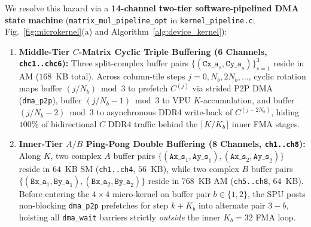 \documentclass[journal]{IEEEtran}
\begin{document}
We resolve this hazard via a \textbf{14-channel two-tier software-pipelined DMA state machine} (\texttt{matrix\_mul\_pipeline\_opt} in \texttt{kernel\_pipeline.c}; Fig.~\ref{fig:microkernel}(a) and Algorithm~\ref{alg:device_kernel}):
\begin{enumerate}\setlength{\itemsep}{0.5pt}\setlength{\parskip}{0pt}
    \item \textbf{Middle-Tier $C$-Matrix Cyclic Triple Buffering (6 Channels, \texttt{chc1..chc6}):} Three split-complex buffer pairs $\{(\texttt{Cx\_a}_s, \texttt{Cy\_a}_s)\}_{s=1}^{3}$ reside in AM ($168$~KB total). Across column-tile steps $j = 0, N_b, 2N_b, \dots$, cyclic rotation maps buffer $(j/N_b) \bmod 3$ to prefetch $C^{(j)}$ via strided P2P DMA (\texttt{dma\_p2p}), buffer $(j/N_b - 1) \bmod 3$ to VPU $K$-accumulation, and buffer $(j/N_b - 2) \bmod 3$ to asynchronous DDR4 write-back of $C^{(j-2N_b)}$, hiding $100\%$ of bidirectional $C$ DDR4 traffic behind the $\lceil K / K_b \rceil$ inner FMA stages.
    \item \textbf{Inner-Tier $A/B$ Ping-Pong Double Buffering (8 Channels, \texttt{ch1..ch8}):} Along $K$, two complex $A$ buffer pairs $\{(\texttt{Ax\_s}_1, \texttt{Ay\_s}_1), (\texttt{Ax\_s}_2, \texttt{Ay\_s}_2)\}$ reside in $64$~KB SM (\texttt{ch1..ch4}, $56$~KB), while two complex $B$ buffer pairs $\{(\texttt{Bx\_a}_1, \texttt{By\_a}_1), (\texttt{Bx\_a}_2, \texttt{By\_a}_2)\}$ reside in $768$~KB AM (\texttt{ch5..ch8}, $64$~KB). Before entering the $4 \times 4$ micro-kernel on buffer pair $b \in \{1, 2\}$, the SPU posts non-blocking \texttt{dma\_p2p} prefetches for step $k + K_b$ into alternate pair $3 - b$, hoisting all \texttt{dma\_wait} barriers strictly \emph{outside} the inner $K_b=32$ FMA loop.
\end{enumerate}
\end{document}
